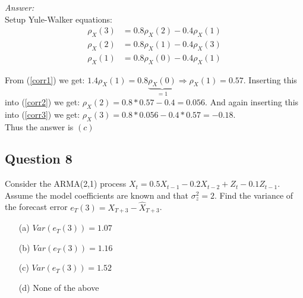 \begin{footnotesize}
    \textit{Answer:} \\
    Setup Yule-Walker equations:
    \begin{align}
        \rho_X(3) &= 0.8\rho_X(2) -0.4\rho_X(1)\label{corr3} \\
        \rho_X(2) &= 0.8\rho_X(1)- 0.4\rho_X(3) \label{corr2} \\
        \rho_X(1) &= 0.8 \rho_X(0)- 0.4 \rho_X(1) \label{corr1}
    \end{align}
    
    From (\ref{corr1}) we get: $1.4 \rho_X(1)=0.8\underbrace{\rho_X(0)}_{=1} \Rightarrow \rho_X(1)=0.57$. Inserting this into (\ref{corr2}) we get: $\rho_X(2)=0.8*0.57 -0.4=0.056$. And again inserting this into (\ref{corr3}) we get: $\rho_X(3)=0.8 * 0.056-0.4*0.57 = -0.18$.\\

    Thus the answer is $(c)$
\end{footnotesize}


\subsection*{Question 8}

Consider the ARMA(2,1) process $X_t = 0.5X_{t-1}-0.2X_{t-2}+Z_t -0.1Z_{t-1}$. Assume the model coefficients are known and that $\sigma_z^2=2$. Find the variance of the forecast error $e_T(3)=X_{T+3}-\hat{X}_{T+3}$.

\begin{itemize}
    \item[(a)] $Var(e_T(3))=1.07$
    \item[(b)] $Var(e_T(3))=1.16$
    \item[(c)] $Var(e_T(3))=1.52$
    \item[(d)] None of the above
\end{itemize}

